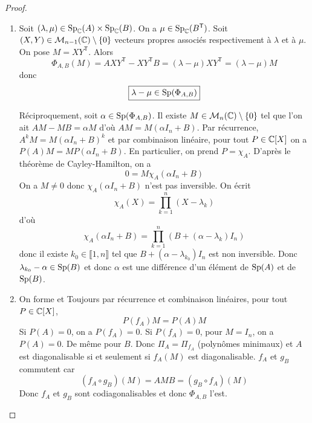 \documentclass[12pt]{article}
\begin{document}
\begin{proof}
	\phantom{}
	\begin{enumerate}
		\item Soit $(\lambda,\mu)\in\operatorname{Sp}_{\mathbb{C}}(A)\times\operatorname{Sp}_{\mathbb{C}}(B)$. On a $\mu\in\operatorname{Sp}_{\mathbb{C}}(B^{\mathsf{T}})$. Soit $(X,Y)\in\mathcal{M}_{n-1}(\mathbb{C})\setminus\lbrace0\rbrace$ vecteurs propres associés respectivement à $\lambda$ et à $\mu$. On pose $M=XY^{\mathsf{T}}$. Alors
		\begin{equation}
			\Phi_{A,B}(M)=AXY^{\mathsf{T}}-XY^{\mathsf{T}}B=(\lambda-\mu)XY^{\mathsf{T}}=(\lambda-\mu)M
		\end{equation}
		donc 
		\begin{equation}
			\boxed{\lambda-\mu\in\operatorname{Sp}(\Phi_{A,B})}
		\end{equation}

		Réciproquement, soit $\alpha\in\operatorname{Sp}(\Phi_{A,B})$. Il existe $M\in\mathcal{M}_{n}(\mathbb{C})\setminus\lbrace0\rbrace$ tel que l'on ait $AM-MB=\alpha M$ d'où $AM=M(\alpha I_{n}+B)$. Par récurrence, $A^{k}M=M(\alpha I_{n}+B)^{k}$ et par combinaison linéaire, pour tout $P\in\mathbb{C}[X]$ on a $P(A)M=MP(\alpha I_{n}+B)$. En particulier, on prend $P=\chi_{A}$. D'après le théorème de Cayley-Hamilton, on a 
		\begin{equation}
			0=M\chi_{A}(\alpha I_{n}+B)
		\end{equation}
		On a $M\neq0$ donc $\chi_{A}(\alpha I_{n}+B)$ n'est pas inversible. On écrit 
		\begin{equation}
			\chi_{A}(X)=\prod_{k=1}^{n}(X-\lambda_{k})
		\end{equation}
		d'où 
		\begin{equation}
			\chi_{A}(\alpha I_{n}+B)=\prod_{k=1}^{n}(B+(\alpha-\lambda_{k})I_{n})
		\end{equation}
		donc il existe $k_{0}\in\llbracket1,n\rrbracket$ tel que $B+(\alpha-\lambda_{k_{0}})I_{n}$ est non inversible. Donc $\lambda_{k_{0}}-\alpha\in\operatorname{Sp}(B)$ et donc $\alpha$ est une différence d'un élément de $\operatorname{Sp}(A)$ et de $\operatorname{Sp}(B)$.

		\item On forme  et 
		Toujours par récurrence et combinaison linéaires, pour tout $P\in\mathbb{C}[X]$,
		\begin{equation}
			P(f_{A})M=P(A)M
		\end{equation}
		Si $P(A)=0$, on a $P(f_{A})=0$. Si $P(f_{A})=0$, pour $M=I_{n}$, on a $P(A)=0$. De même pour $B$. Donc $\Pi_{A}=\Pi_{f_{A}}$ (polynômes minimaux) et $A$ est diagonalisable si et seulement si $f_{A}(M)$ est diagonalisable. $f_{A}$ et $g_{B}$ commutent car 
		\begin{equation}
			(f_{A}\circ g_{B})(M)=AMB=(g_{B}\circ f_{A})(M)
		\end{equation}
		Donc $f_{A}$ et $g_{B}$ sont codiagonalisables et donc $\Phi_{A,B}$ l'est.
	\end{enumerate}
\end{proof}
\end{document}
